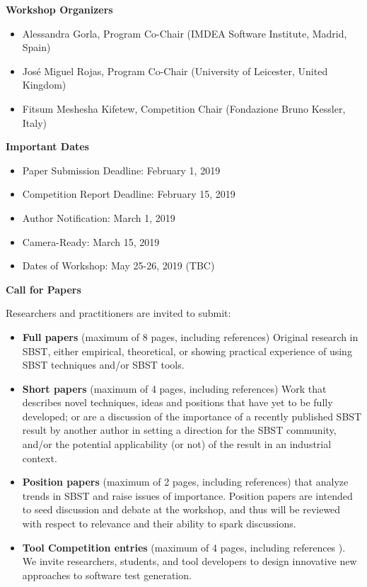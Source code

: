 \documentclass[10pt,conference]{IEEEtran}
\begin{document}
\smallskip\noindent\textbf{Workshop Organizers}
\begin{itemize}
\setlength{\itemsep}{1pt}
  \setlength{\parskip}{0pt}
  \setlength{\parsep}{0pt}
\item{Alessandra Gorla, Program Co-Chair \newline 
    (IMDEA Software Institute, Madrid, Spain)}
  \item{Jos{\'e} Miguel Rojas, Program Co-Chair \newline 
(University of Leicester, United Kingdom)}
\item{Fitsum Meshesha Kifetew, Competition Chair \newline
(Fondazione Bruno Kessler, Italy)}
\end{itemize}

\smallskip\noindent\textbf{Important Dates}
\begin{itemize}
\setlength{\itemsep}{1pt}
  \setlength{\parskip}{0pt}
  \setlength{\parsep}{0pt}
\item{Paper Submission Deadline: February 1, 2019}
\item{Competition Report Deadline: February 15, 2019}
\item{Author Notification: March 1, 2019}
\item{Camera-Ready: March 15, 2019}
\item{Dates of Workshop: May 25-26, 2019 (TBC)}
\end{itemize}

\smallskip\noindent\textbf{Call for Papers}

\noindent Researchers and practitioners are invited to submit:
\begin{itemize}
\setlength{\itemsep}{1pt}
  \setlength{\parskip}{0pt}
  \setlength{\parsep}{0pt}
\item \textbf{Full papers} (maximum of 8 pages, including references)
  Original research in SBST, either empirical, theoretical, or
  showing practical experience of using SBST techniques and/or SBST
  tools.
  \item \textbf{Short papers} (maximum of 4 pages, including
    references) Work that describes novel techniques, ideas and
    positions that have yet to be fully developed; or are a discussion
    of the importance of a recently published SBST result by another
    author in setting a direction for the SBST community, and/or the
    potential applicability (or not) of the result in an industrial
    context.
  \item \textbf{Position papers} (maximum of 2 pages, including
    references) that analyze trends in SBST and raise issues of
    importance. Position papers are intended to seed discussion and
    debate at the workshop, and thus will be reviewed with respect to
    relevance and their ability to spark discussions.
  \item \textbf{Tool Competition entries} (maximum of 4 pages,
    including references
    ). We invite researchers, students, and tool
    developers to design innovative new approaches to software test
    generation.
\end{itemize}
\end{document}

